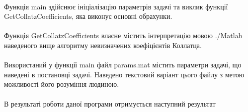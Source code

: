 \documentclass[titlepage]{article}
\begin{document}
\paragraph{}
Функція main здійснює ініціалізацію параметрів задачі та виклик функції \\GetCollatzCoefficients, яка виконує основні обрахунки.

\paragraph{}
Функція GetCollatzCoefficients власне містить інтерпретацію мовою ./Matlab наведеного вище алгоритму невизначених коефіцієнтів Коллатца.

\paragraph{}
Використаний у функції main файл params.mat містить параметри задачі, що наведені в постановці задачі. Наведено текстовий варіант цього файлу з метою можливості його розуміння людиною.

\paragraph{}
В результаті роботи даної програми отримується наступний результат

\end{document}
